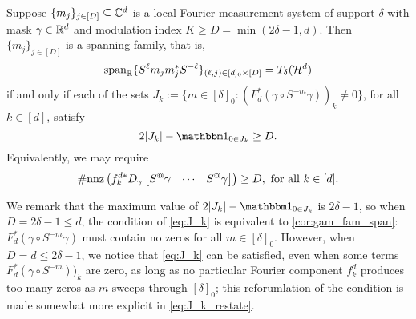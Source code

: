 \begin{proposition}  \label{prop:span_fam} \label{prop:gam_span_herm}
  Suppose $\{m_j\}_{j \in [D]} \subseteq \mathbb{C}^d$ is a local Fourier measurement system of support $\delta$ with mask $\gamma \in \mathbb{R}^d$ and modulation index $K \ge D = \min (2 \delta - 1, d)$.  Then $\{m_j\}_{j \in [D]}$ is a spanning family, that is, \[\operatorname{span}_{\mathbb{R}}\{S^{\ell} m_j m_j^* S^{-\ell}\}_{(\ell, j) \in [d]_0 \times [D]} = T_\delta(\mathcal{H}^d)\] if and only if each of the sets $J_k := \{m \in [\delta]_0 : (F_d^* (\gamma \circ S^{-m} \gamma))_k \neq 0\}$, for all $k \in [d]$, satisfy \begin{equation} %
    2 \abs{J_k} - \one_{0 \in J_k} \ge D
    .\label{eq:J_k}\end{equation}  Equivalently, we may require \begin{equation} \#\mathrm{nnz}\left(f_k^{d*} D_\gamma \rowmatfun{S^@ \gamma}{1 - \delta}{\delta - 1}\right) \ge D, \ \text{for all} \ k \in [d].\label{eq:J_k_restate}\end{equation}
\end{proposition}

We remark that the maximum value of $2 \abs{J_k} - \one_{0 \in J_k}$ is $2 \delta - 1$, so when $D = 2 \delta - 1 \le d$, the condition of \eqref{eq:J_k} is equivalent to \cref{cor:gam_fam_span}: $F_d^* (\gamma \circ S^{-m} \gamma)$ must contain no zeros for all $m \in [\delta]_0$.  However, when $D = d \le 2 \delta - 1$, we notice that \eqref{eq:J_k} can be satisfied, even when some terms $F_d^* (\gamma \circ S^{-m}))_k$ are zero, as long as no particular Fourier component $f_k^d$ produces too many zeros as $m$ sweeps through $[\delta]_0$; this reforumlation of the condition is made somewhat more explicit in \eqref{eq:J_k_restate}.
